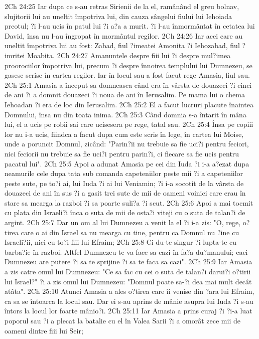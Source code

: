 2Ch 24:25  Iar dupa ce s-au retras Sirienii de la el, ramânând el greu bolnav, slujitorii lui au uneltit împotriva lui, din cauza sângelui fiului lui Iehoiada preotul; ?i l-au ucis în patul lui ?i a?a a murit. ?i l-au înmormântat în cetatea lui David, însa nu l-au îngropat în mormântul regilor.
2Ch 24:26  Iar acei care au uneltit împotriva lui au fost: Zabad, fiul ?imeatei Amonita ?i Iehozabad, fiul ?imritei Moabita.
2Ch 24:27  Amanuntele despre fiii lui ?i despre mul?imea proorociilor împotriva lui, precum ?i despre înnoirea templului lui Dumnezeu, se gasesc scrise în cartea regilor. Iar în locul sau a fost facut rege Amasia, fiul sau.
2Ch 25:1  Amasia a început sa domneasca când era în vârsta de douazeci ?i cinci de ani ?i a domnit douazeci ?i noua de ani în Ierusalim. Pe mama lui o chema Iehoadan ?i era de loc din Ierusalim.
2Ch 25:2  El a facut lucruri placute înaintea Domnului, însa nu din toata inima.
2Ch 25:3  Când domnia s-a întarit în mâna lui, el a ucis pe robii sai care ucisesera pe rege, tatal sau.
2Ch 25:4  Însa pe copiii lor nu i-a ucis, fiindca a facut dupa cum este scris în lege, în cartea lui Moise, unde a poruncit Domnul, zicând: "Parin?ii nu trebuie sa fie uci?i pentru feciori, nici feciorii nu trebuie sa fie uci?i pentru parin?i, ci fiecare sa fie ucis pentru pacatul lui".
2Ch 25:5  Apoi a adunat Amasia pe cei din Iuda ?i i-a a?ezat dupa neamurile cele dupa tata sub comanda capeteniilor peste mii ?i a capeteniilor peste sute, pe to?i ai, lui Iuda ?i ai lui Veniamin; ?i i-a socotit de la vârsta de douazeci de ani în sus ?i a gasit trei sute de mii de oameni voinici care erau în stare sa mearga la razboi ?i sa poarte suli?a ?i scut.
2Ch 25:6  Apoi a mai tocmit cu plata din Israeli?i înca o suta de mii de osta?i viteji cu o suta de talan?i de argint.
2Ch 25:7  Dar un om al lui Dumnezeu a venit la el ?i i-a zis: "O, rege, o?tirea care o ai din Israel sa nu mearga cu tine, pentru ca Domnul nu ?ine cu Israeli?ii, nici cu to?i fiii lui Efraim;
2Ch 25:8  Ci du-te singur ?i lupta-te cu barba?ie în razboi. Altfel Dumnezeu te va face sa cazi în fa?a du?manului; caci Dumnezeu are putere ?i sa te sprijine ?i sa te faca sa cazi".
2Ch 25:9  Iar Amasia a zis catre omul lui Dumnezeu: "Ce sa fac cu cei o suta de talan?i darui?i o?tirii lui Israel?" ?i a zis omul lui Dumnezeu: "Domnul poate sa-?i dea mai mult decât atâta".
2Ch 25:10  Atunci Amasia a ales o?tirea care îi venise din ?ara lui Efraim, ca sa se întoarca la locul sau. Dar ei s-au aprins de mânie asupra lui Iuda ?i s-au întors la locul lor foarte mânio?i.
2Ch 25:11  Iar Amasia a prins curaj ?i ?i-a luat poporul sau ?i a plecat la batalie cu el în Valea Sarii ?i a omorât zece mii de oameni dintre fiii lui Seir;
